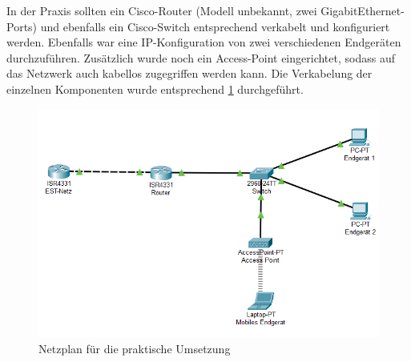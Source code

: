 In der Praxis sollten ein Cisco-Router (Modell unbekannt, zwei GigabitEthernet-Ports) und ebenfalls ein Cisco-Switch entsprechend verkabelt und konfiguriert werden. Ebenfalls war eine IP-Konfiguration von zwei verschiedenen Endgeräten durchzuführen. Zusätzlich wurde noch ein Access-Point eingerichtet, sodass auf das Netzwerk auch kabellos zugegriffen werden kann. Die Verkabelung der einzelnen Komponenten wurde entsprechend \ref{fig:netzplan_physisch} durchgeführt.

\begin{figure}[h]
	\centering
	\includegraphics[width=15cm]{images/Netzplan_physisch.png}
	\caption[Praktischer Netzplan]{Netzplan für die praktische Umsetzung}
	\label{fig:netzplan_physisch}
\end{figure}